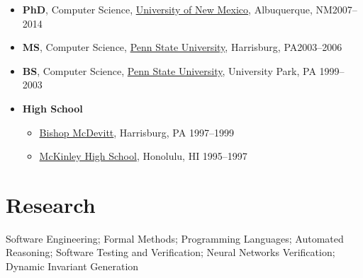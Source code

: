 \documentclass[11pt]{article}
\begin{document}
\begin{itemize}
    
    \item \textbf{PhD}, Computer Science,  \href{https://www.unm.edu}{University of New Mexico}, Albuquerque, NM\hfill 2007--2014
    
    \item \textbf{MS}, Computer Science,  \href{https://www.hbg.psu.edu}{Penn State University}, Harrisburg, PA\hfill 2003--2006
    
    \item \textbf{BS}, Computer Science, \href{https://www.psu.edu}{Penn State University}, University Park, PA \hfill 1999--2003
    
    \item \textbf{High School}
    \begin{itemize}
        \item \href{https://www.bishopmcdevitt.org/mcd/}{Bishop McDevitt}, Harrisburg, PA \hfill 1997--1999
        \item \href{https://www.mckinley.k12.hi.us/}{McKinley High School}, Honolulu, HI \hfill 1995--1997
    \end{itemize}
    
    
\end{itemize}

\section{Research}
\begin{description}[before=\small]
    \item Software Engineering; Formal Methods; Programming Languages; Automated Reasoning; Software Testing and Verification; Neural Networks Verification; Dynamic Invariant Generation
\end{description}
\end{document}
